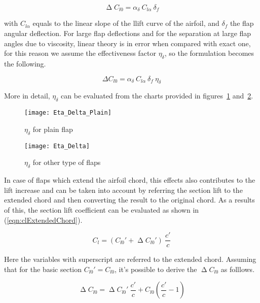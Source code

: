 \begin{equation}
\upDelta C_{l0}=\alpha_\delta\ C_{l\alpha}\ \delta_f
\label{eqn:DeltaCl0}
\end{equation}

with $C_{l\alpha}$ equals to the linear slope of the llift curve of the airfoil, and $\delta_{f}$ the flap angular deflection. For large flap deflections and for the separation at large flap angles due to viscosity, linear theory is in error when compared with exact one, for this reason we assume the effectiveness factor $\eta_\delta$, so the formulation becomes the following.

\begin{equation}
\Delta C_{l0}=\alpha_\delta\ C_{l\alpha}\ \delta_f\ \eta_\delta
\label{eqn:DeltaCl0EtaDelta}
\end{equation}

More in detail, $\eta_\delta$ can be evaluated from the charts provided in figures~\ref{fig:EtaDeltaPlain} and~\ref{fig:EtaDelta}.

\begin{figure}[!t]
  \centering
  \texttt{[image: Eta\_Delta\_Plain]}
  \caption{$\eta_\delta$ for plain flap}
  \label{fig:EtaDeltaPlain}
\end{figure}

\begin{figure}[!b]
  \centering
  \texttt{[image: Eta\_Delta]}
  \caption{$\eta_\delta$ for other type of flaps}
  \label{fig:EtaDelta}
\end{figure}

\noindent
In case of flaps which extend the airfoil chord, this effects also contributes to the lift increase and can be taken into account by referring the section lift to the extended chord and then converting the result to the original chord. As a results of this, the section lift coefficient can be evaluated as shown in (\ref{eqn:clExtendedChord}).

\begin{equation}
C_{l}=\left(C_{l0}'+\upDelta C_{l0}'\right)\ \frac{c'}{c}
\label{eqn:clExtendedChord}
\end{equation}

\noindent 
Here the variables with superscript are referred to the extended chord. Assuming that for the basic section $C_{l0}'=C_{l0}$, it's possible to derive the $\upDelta C_{l0}$ as folllows.

\begin{equation}
\upDelta C_{l0}=\upDelta C_{l0}'\ \frac{c'}{c}+C_{l0}\left(\frac{c'}{c}-1\right)
\label{eqn:Deltacl0Final}
\end{equation}


